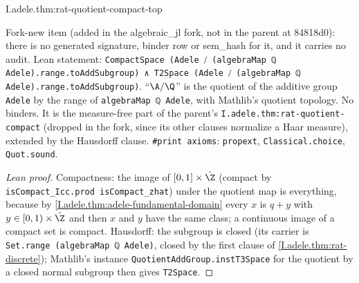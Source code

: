 
\begin{theorem}
\end{theorem}
\begin{tfformal}{I.adele.thm:rat-quotient-compact-top}
\begin{tffidelity}
Fork-new item (added in the algebraic\_jl fork, not in the parent at 84818d0): there is no generated signature, binder
row or sem\_hash for it, and it carries no audit. Lean statement: \texttt{CompactSpace (Adele ⧸ (algebraMap ℚ
Adele).range.toAddSubgroup) ∧ T2Space (Adele ⧸ (algebraMap ℚ Adele).range.toAddSubgroup)}. ``$\A/\Q$'' is the quotient
of the additive group \texttt{Adele} by the range of \texttt{algebraMap ℚ Adele}, with Mathlib's quotient topology. No
binders. It is the measure-free part of the parent's \texttt{I.adele.thm:rat-quotient-compact} (dropped in the fork,
since its other clauses normalize a Haar measure), extended by the Hausdorff clause. \texttt{\#print axioms}:
\texttt{propext}, \texttt{Classical.choice}, \texttt{Quot.sound}.
\end{tffidelity}
\end{tfformal}
\begin{proof}[Lean proof]
Compactness: the image of $[0,1]\times\hat\Z$ (compact by \texttt{isCompact\_Icc.prod isCompact\_zhat}) under the
quotient map is everything, because by \cref{I.adele.thm:adele-fundamental-domain} every $x$ is $q+y$ with $y\in
[0,1)\times\hat\Z$ and then $x$ and $y$ have the same class; a continuous image of a compact set is compact. Hausdorff:
the subgroup is closed (its carrier is \texttt{Set.range (algebraMap ℚ Adele)}, closed by the first clause of
\cref{I.adele.thm:rat-discrete}); Mathlib's instance \texttt{QuotientAddGroup.instT3Space} for the quotient by a closed
normal subgroup then gives \texttt{T2Space}.
\end{proof}
